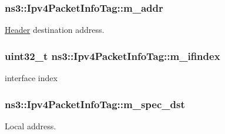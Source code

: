 \subsubsection[{\texorpdfstring{m\+\_\+addr}{m_addr}}]{ ns3\+::\+Ipv4\+Packet\+Info\+Tag\+::m\+\_\+addr\hspace{0.3cm}{\ttfamily [private]}}\hypertarget{classns3_1_1Ipv4PacketInfoTag_aa4264ecd6a3a8f0300f32bee4e75b7d0}{}\label{classns3_1_1Ipv4PacketInfoTag_aa4264ecd6a3a8f0300f32bee4e75b7d0}


\hyperlink{classns3_1_1Header}{Header} destination address. 

\subsubsection[{\texorpdfstring{m\+\_\+ifindex}{m_ifindex}}]{\setlength{\rightskip}{0pt plus 5cm}uint32\+\_\+t ns3\+::\+Ipv4\+Packet\+Info\+Tag\+::m\+\_\+ifindex\hspace{0.3cm}{\ttfamily [private]}}\hypertarget{classns3_1_1Ipv4PacketInfoTag_ae75a1d491dcd857bf4809a92d83ff9ce}{}\label{classns3_1_1Ipv4PacketInfoTag_ae75a1d491dcd857bf4809a92d83ff9ce}


interface index 

\subsubsection[{\texorpdfstring{m\+\_\+spec\+\_\+dst}{m_spec_dst}}]{ ns3\+::\+Ipv4\+Packet\+Info\+Tag\+::m\+\_\+spec\+\_\+dst\hspace{0.3cm}{\ttfamily [private]}}\hypertarget{classns3_1_1Ipv4PacketInfoTag_a8200ce51571008476143daeb3b292196}{}\label{classns3_1_1Ipv4PacketInfoTag_a8200ce51571008476143daeb3b292196}


Local address. 

